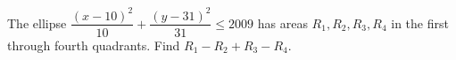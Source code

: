 The ellipse $\dfrac{(x-10)^2}{10}+\dfrac{(y-31)^2}{31}\le2009$ has areas $R_1,R_2,R_3,R_4$ in the first through fourth quadrants. Find $R_1-R_2+R_3-R_4$.
